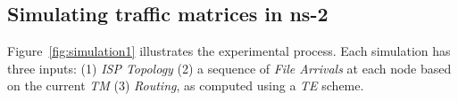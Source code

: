 



\subsection{Simulating traffic matrices in ns-2}
\label{sec:sim_TM}

Figure~\ref{fig:simulation1} illustrates the experimental process. Each simulation has three inputs: (1) \textsl{ISP Topology} (2) a sequence of \textsl{File Arrivals} at each node based on the current \textsl{TM} (3) \textsl{Routing}, as computed using a \textsl{TE} scheme. %

